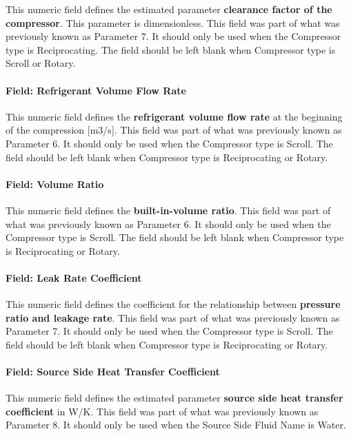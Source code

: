 This numeric field defines the estimated parameter \textbf{clearance factor of the compressor}. This parameter is dimensionless. This field was part of what was previously known as Parameter 7. It should only be used when the Compressor type is Reciprocating. The field should be left blank when Compressor type is Scroll or Rotary.

\paragraph{Field: Refrigerant Volume Flow Rate}\label{field-refrigerant-volume-flow-rate-1}

This numeric field defines the \textbf{refrigerant volume flow rate} at the beginning of the compression {[}m3/s{]}. This field was part of what was previously known as Parameter 6. It should only be used when the Compressor type is Scroll. The field should be left blank when Compressor type is Reciprocating or Rotary.

\paragraph{Field: Volume Ratio}\label{field-volume-ratio-1}

This numeric field defines the \textbf{built-in-volume ratio}. This field was part of what was previously known as Parameter 6. It should only be used when the Compressor type is Scroll. The field should be left blank when Compressor type is Reciprocating or Rotary.

\paragraph{Field: Leak Rate Coefficient}\label{field-leak-rate-coefficient-1}

This numeric field defines the coefficient for the relationship between \textbf{pressure ratio and leakage rate}. This field was part of what was previously known as Parameter 7. It should only be used when the Compressor type is Scroll. The field should be left blank when Compressor type is Reciprocating or Rotary.

\paragraph{Field: Source Side Heat Transfer Coefficient}\label{field-source-side-heat-transfer-coefficient-1}

This numeric field defines the estimated parameter \textbf{source side heat transfer coefficient} in W/K. This field was part of what was previously known as Parameter 8. It should only be used when the Source Side Fluid Name is Water.

